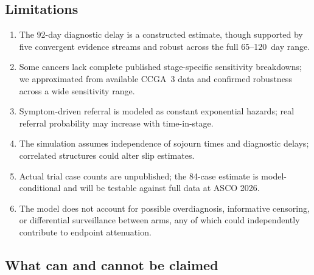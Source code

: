 \documentclass[11pt,letter]{article}
\begin{document}
\subsection{Limitations}

\begin{enumerate}[nosep]
\item The 92-day diagnostic delay is a constructed estimate, though
  supported by five convergent evidence streams and robust across the full
  65--120~day range.

\item Some cancers lack complete published stage-specific sensitivity
  breakdowns; we approximated from available CCGA~3 data and confirmed
  robustness across a wide sensitivity range.

\item Symptom-driven referral is modeled as constant exponential hazards;
  real referral probability may increase with time-in-stage.

\item The simulation assumes independence of sojourn times and diagnostic
  delays; correlated structures could alter slip estimates.

\item Actual trial case counts are unpublished; the 84-case estimate is
  model-conditional and will be testable against full data at ASCO 2026.

\item The model does not account for possible overdiagnosis, informative
  censoring, or differential surveillance between arms, any of which could
  independently contribute to endpoint attenuation.
\end{enumerate}


\subsection*{What can and cannot be claimed}
\end{document}
